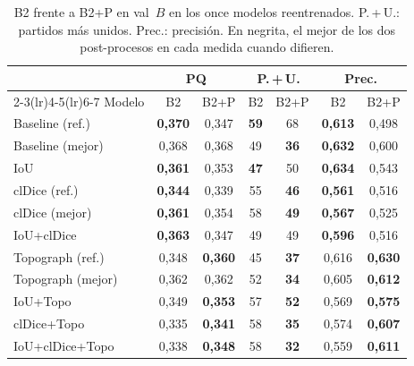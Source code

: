 \begin{table}[htbp]
\centering
\small
\begin{tabular}{@{}lcccccc@{}}
\toprule
 & \multicolumn{2}{c}{PQ} & \multicolumn{2}{c}{P.\,+\,U.} & \multicolumn{2}{c}{Prec.}\\
\cmidrule(lr){2-3}\cmidrule(lr){4-5}\cmidrule(lr){6-7}
Modelo & B2 & B2+P & B2 & B2+P & B2 & B2+P\\
\midrule
Baseline (ref.)   & \textbf{0,370} & 0,347 & \textbf{59} & 68 & \textbf{0,613} & 0,498\\
Baseline (mejor)  & 0,368 & 0,368 & 49 & \textbf{36} & \textbf{0,632} & 0,600\\
IoU               & \textbf{0,361} & 0,353 & \textbf{47} & 50 & \textbf{0,634} & 0,543\\
clDice (ref.)     & \textbf{0,344} & 0,339 & 55 & \textbf{46} & \textbf{0,561} & 0,516\\
clDice (mejor)    & \textbf{0,361} & 0,354 & 58 & \textbf{49} & \textbf{0,567} & 0,525\\
IoU+clDice        & \textbf{0,363} & 0,347 & 49 & 49 & \textbf{0,596} & 0,516\\
\midrule
Topograph (ref.)  & 0,348 & \textbf{0,360} & 45 & \textbf{37} & 0,616 & \textbf{0,630}\\
Topograph (mejor) & 0,362 & 0,362 & 52 & \textbf{34} & 0,605 & \textbf{0,612}\\
IoU+Topo          & 0,349 & \textbf{0,353} & 57 & \textbf{52} & 0,569 & \textbf{0,575}\\
clDice+Topo       & 0,335 & \textbf{0,341} & 58 & \textbf{35} & 0,574 & \textbf{0,607}\\
IoU+clDice+Topo   & 0,338 & \textbf{0,348} & 58 & \textbf{32} & 0,559 & \textbf{0,611}\\
\bottomrule
\end{tabular}
\caption{B2 frente a B2+P en val~$B$ en los once modelos reentrenados.
P.\,+\,U.: partidos más unidos. Prec.: precisión. En negrita, el mejor
de los dos post-procesos en cada medida cuando difieren.}
\label{tab:res-b2p}
\end{table}

